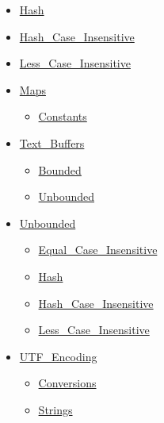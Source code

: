 \documentclass[english]{article}
\begin{document}
\begin{scriptsize}
\begin{multicols*}{5}
\begin{itemize}[leftmargin=0mm]
\begin{itemize}[leftmargin=5mm]
\begin{itemize}[leftmargin=5mm]
\begin{itemize}[leftmargin=5mm]
	  \end{itemize}
	\item[] \href{http://www.ada-auth.org/standards/22rm/html/RM-A-4-9.html}{Hash}
	\item[] \href{http://www.ada-auth.org/standards/22rm/html/RM-A-4-9.html}{Hash\_Case\_Insensitive}
	\item[] \href{http://www.ada-auth.org/standards/22rm/html/RM-A-4-10.html}{Less\_Case\_Insensitive}
	\item[] \href{http://www.ada-auth.org/standards/22rm/html/RM-A-4-2.html}{Maps}
	  \begin{itemize}[leftmargin=5mm]
	  \item[] \href{http://www.ada-auth.org/standards/22rm/html/RM-A-4-6.html}{Constants}
	  \end{itemize}
	\item[] \href{http://www.ada-auth.org/standards/22rm/html/RM-A-4-12.html}{Text\_Buffers}
	  \begin{itemize}[leftmargin=5mm]
	  \item[] \href{http://www.ada-auth.org/standards/22rm/html/RM-A-4-12.html}{Bounded}
	  \item[] \href{http://www.ada-auth.org/standards/22rm/html/RM-A-4-12.html}{Unbounded}
	  \end{itemize}
	\item[] \href{http://www.ada-auth.org/standards/22rm/html/RM-A-4-5.html}{Unbounded}
	  \begin{itemize}[leftmargin=5mm]
	  \item[] \href{http://www.ada-auth.org/standards/22rm/html/RM-A-4-10.html}{Equal\_Case\_Insensitive}
	  \item[] \href{http://www.ada-auth.org/standards/22rm/html/RM-A-4-9.html}{Hash}
	  \item[] \href{http://www.ada-auth.org/standards/22rm/html/RM-A-4-9.html}{Hash\_Case\_Insensitive}
	  \item[] \href{http://www.ada-auth.org/standards/22rm/html/RM-A-4-10.html}{Less\_Case\_Insensitive}
	  \end{itemize}
	\item[] \href{http://www.ada-auth.org/standards/22rm/html/RM-A-4-11.html}{UTF\_Encoding}
	  \begin{itemize}[leftmargin=5mm]
	  \item[] \href{http://www.ada-auth.org/standards/22rm/html/RM-A-4-11.html}{Conversions}
	  \item[] \href{http://www.ada-auth.org/standards/22rm/html/RM-A-4-11.html}{Strings}

\end{itemize}
\end{itemize}
\end{itemize}
\end{itemize}
\end{multicols*}
\end{scriptsize}
\end{document}
